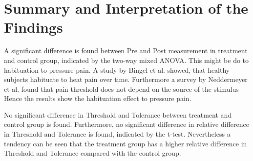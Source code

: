\section{Summary and Interpretation of the Findings}


A significant difference is found between Pre and Post measurement in treatment and control group, indicated by the two-way mixed ANOVA. This might be do to habituation to pressure pain. A study by Bingel et al. \cite{Bingel2007} showed, that healthy subjects habituate to heat pain over time.  Furthermore a survey by Neddermeyer et al. \cite{Neddermeyer2007} found that pain threshold does not depend on the source of the stimulus %
Hence the results show the habituation effect to pressure pain.

No significant difference in Threshold and Tolerance between treatment and control group is found. Furthermore, no significant difference in relative difference in Threshold and Tolerance is found, indicated by the t-test. Nevertheless a tendency can be seen that the treatment group has a higher relative difference in Threshold and Tolerance compared with the control group. 

